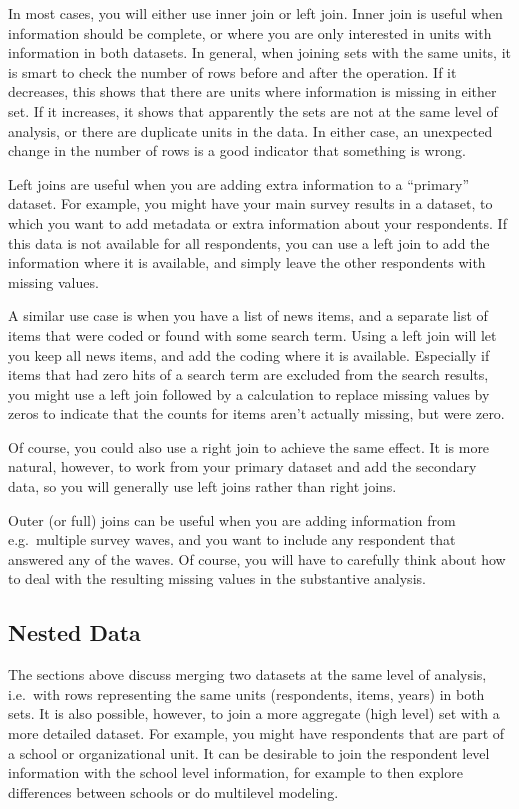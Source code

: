 In most cases, you will either use inner join or left join.
Inner join is useful when information should be complete,
or where you are only interested in units with information in both datasets.
In general, when joining sets with the same units, it is smart to check the number of rows before and after the operation.
If it decreases, this shows that there are units where information is missing in either set.
If it increases, it shows that apparently the sets are not at the same level of analysis,
or there are duplicate units in the data.
In either case, an unexpected change in the number of rows is a good indicator that something is wrong.

Left joins are useful when you are adding extra information to a ``primary'' dataset.
For example, you might have your main survey results in a dataset,
to which you want to add metadata or extra information about your respondents.
If this data is not available for all respondents, you can use a left join to add the information
where it is available, and simply leave the other respondents with missing values.


A similar use case is when you have a list of news items, and a separate list of items that were coded
or found with some search term. Using a left join will let you keep all news items, and add the coding where it is available.
Especially if items that had zero hits of a search term are excluded from the search results,
you might use a left join followed by a calculation to replace missing values by zeros to indicate that the counts for
items aren't actually missing, but were zero.

Of course, you could also use a right join to achieve the same effect.
It is more natural, however, to work from your primary dataset and add the secondary data,
so you will generally use left joins rather than right joins.

Outer (or full) joins can be useful when you are adding information from e.g.\ multiple survey waves,
and you want to include any respondent that answered any of the waves.
Of course, you will have to carefully think about how to deal with the resulting missing values in the substantive analysis.

\subsection{Nested Data}

The sections above discuss merging two datasets at the same level of analysis,
i.e.\ with rows representing the same units (respondents, items, years) in both sets.
It is also possible, however, to join a more aggregate (high level) set with a more detailed dataset.
For example, you might have respondents that are part of a school or organizational unit.
It can be desirable to join the respondent level information with the school level information,
for example to then explore differences between schools or do multilevel modeling.

